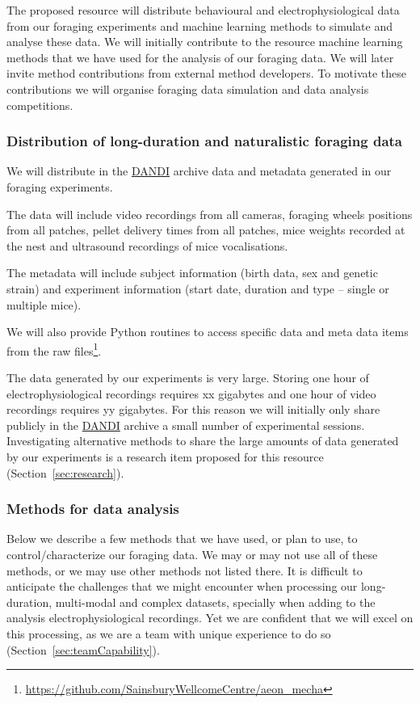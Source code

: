 
The proposed resource will distribute behavioural and electrophysiological data
from our foraging experiments and machine learning methods to simulate and analyse
these data. We will initially contribute to the resource machine learning
methods that we have used for the analysis of our foraging data. We will later
invite method contributions from external method developers. To motivate these
contributions we will organise foraging data simulation and data analysis
competitions.

\subsubsection{Distribution of long-duration and naturalistic foraging data}

We will distribute in the \href{https://dandiarchive.org/}{DANDI} archive data
and metadata generated in our foraging experiments.

The data will include
video recordings from all cameras,
foraging wheels positions from all patches,
pellet delivery times from all patches,
mice weights recorded at the nest and
ultrasound recordings of mice vocalisations.

The metadata will include
subject information (birth data, sex and genetic strain) and
experiment information (start date, duration and type -- single or multiple
mice).

We will also provide Python routines to access specific data and meta data
items from the raw
files\footnote{\url{https://github.com/SainsburyWellcomeCentre/aeon_mecha}}.

The data generated by our experiments is very large. Storing one hour of
electrophysiological recordings requires xx gigabytes and one hour of video
recordings requires yy gigabytes. For this reason we will initially only share
publicly in the \href{https://dandiarchive.org/}{DANDI} archive a small number
of experimental sessions.
%
Investigating alternative methods to share the large amounts of data generated
by our experiments is a research item proposed for this resource
(Section~\ref{sec:research}).

\subsubsection{Methods for data analysis}

Below we describe a few methods that we have used, or plan to use, to
control/characterize our foraging data. We may or may not use all of these
methods, or we may use other methods not listed there. It is difficult to
anticipate the challenges that we might encounter when processing our
long-duration, multi-modal and complex datasets, specially when adding to the
analysis electrophysiological recordings. Yet we are confident that we will
excel on this processing, as we are a team with unique experience to do so
(Section~\ref{sec:teamCapability}).


